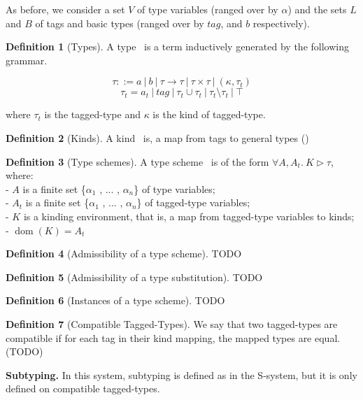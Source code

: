 \documentclass[a4paper,11pt,oneside]{article}
\theoremstyle{definition}
\newtheorem{defsec}{Definition}[section]
\begin{document}
As before, we consider a set $V$ of type variables (ranged over by $\alpha$)
and the sets $L$ and $B$ of tags and basic types (ranged over by $tag$, and
$b$ respectively).

\begin{defsec}[Types]
  A type \texttau\ is a term inductively generated by the following grammar.

  $$ \tau ::= a\ |\ b\ |\ \tau \rightarrow \tau\ |\ \tau \times \tau\ |\ (\kappa, \tau_t) $$
  $$ \tau_t = a_t\ |\ tag\ |\ \tau_t \cup \tau_t\ |\ \tau_t \setminus \tau_t\ |\ \top $$

  where $\tau_t$ is the tagged-type and $\kappa$ is the kind of tagged-type.
\end{defsec}

\begin{defsec}[Kinds]
  A kind \textkappa\ is, a map from tags to general types (\texttau)
\end{defsec}

\begin{defsec}[Type schemes]
  A type scheme \textsigma\ is of the form $\forall A, A_t.\ K \triangleright \tau$, where: \\
  - $A$ is a finite set \{$\alpha_1$ , ... , $\alpha_n$\} of type variables; \\
  - $A_t$ is a finite set \{$\alpha_1$ , ... , $\alpha_n$\} of tagged-type variables; \\
  - $K$ is a kinding environment, that is, a map from tagged-type variables to kinds; \\
  - $\operatorname{dom}(K) = A_t$
\end{defsec}

\begin{defsec}[Admissibility of a type scheme]
  TODO
\end{defsec}

\begin{defsec}[Admissibility of a type substitution]
  TODO
\end{defsec}

\begin{defsec}[Instances of a type scheme]
  TODO
\end{defsec}

\begin{defsec}[Compatible Tagged-Types]
  We say that two tagged-types are compatible if for each tag in their kind
  mapping, the mapped types are equal. (TODO)
\end{defsec}

\textbf{Subtyping.} In this system, subtyping is defined as in the S-system,
but it is only defined on compatible tagged-types.
\end{document}
